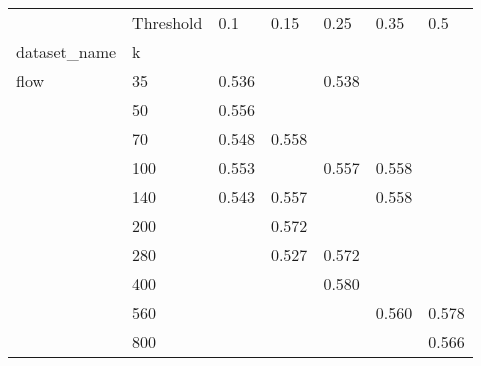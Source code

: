 \begin{tabular}{lllllll}
\toprule
     & Threshold &    0.1 &   0.15 &   0.25 &   0.35 &    0.5 \\
dataset_name & k &        &        &        &        &        \\
\midrule
flow & 35  &  0.536 &        &  0.538 &        &        \\
     & 50  &  0.556 &        &        &        &        \\
     & 70  &  0.548 &  0.558 &        &        &        \\
     & 100 &  0.553 &        &  0.557 &  0.558 &        \\
     & 140 &  0.543 &  0.557 &        &  0.558 &        \\
     & 200 &        &  0.572 &        &        &        \\
     & 280 &        &  0.527 &  0.572 &        &        \\
     & 400 &        &        &  0.580 &        &        \\
     & 560 &        &        &        &  0.560 &  0.578 \\
     & 800 &        &        &        &        &  0.566 \\
\bottomrule
\end{tabular}
